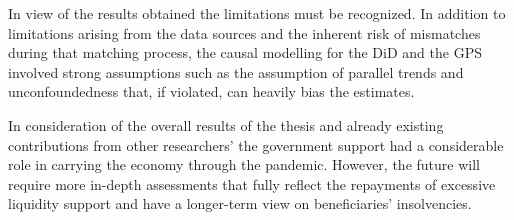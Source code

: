 In view of the results obtained the limitations must be recognized. In addition to limitations arising from the data sources and the inherent risk of mismatches during that matching process, the causal modelling for the DiD and the GPS involved strong assumptions such as the assumption of parallel trends and unconfoundedness that, if violated, can heavily bias the estimates.
 
In consideration of the overall results of the thesis and already existing contributions from other researchers' the government support had a considerable role in carrying the economy through the pandemic. However, the future will require more in-depth assessments that fully reflect the repayments of excessive liquidity support and have a longer-term view on beneficiaries' insolvencies.
